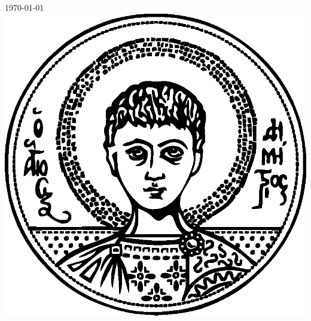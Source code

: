 \begin{titlepage}
    
    
    {\large \today}\\[2cm] %
    
    
    \includegraphics[scale=0.3]{assets/images/auth_logo_black.eps}\\[1cm] %
     
    
    \vfill %
    
    \end{titlepage}
    